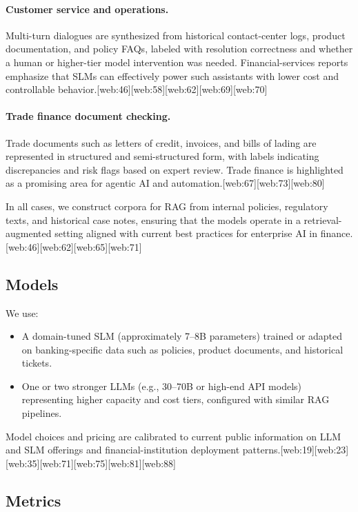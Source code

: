 \documentclass[11pt]{article}
\begin{document}
\paragraph{Customer service and operations.} Multi-turn dialogues are synthesized from historical contact-center logs, product documentation, and policy FAQs, labeled with resolution correctness and whether a human or higher-tier model intervention was needed. Financial-services reports emphasize that SLMs can effectively power such assistants with lower cost and controllable behavior.[web:46][web:58][web:62][web:69][web:70]

\paragraph{Trade finance document checking.} Trade documents such as letters of credit, invoices, and bills of lading are represented in structured and semi-structured form, with labels indicating discrepancies and risk flags based on expert review. Trade finance is highlighted as a promising area for agentic AI and automation.[web:67][web:73][web:80]

In all cases, we construct corpora for RAG from internal policies, regulatory texts, and historical case notes, ensuring that the models operate in a retrieval-augmented setting aligned with current best practices for enterprise AI in finance.[web:46][web:62][web:65][web:71]

\subsection{Models}

We use:
\begin{itemize}
    \item A domain-tuned SLM (approximately 7--8B parameters) trained or adapted on banking-specific data such as policies, product documents, and historical tickets.
    \item One or two stronger LLMs (e.g., 30--70B or high-end API models) representing higher capacity and cost tiers, configured with similar RAG pipelines.
\end{itemize}

Model choices and pricing are calibrated to current public information on LLM and SLM offerings and financial-institution deployment patterns.[web:19][web:23][web:35][web:71][web:75][web:81][web:88]

\subsection{Metrics}
\end{document}
